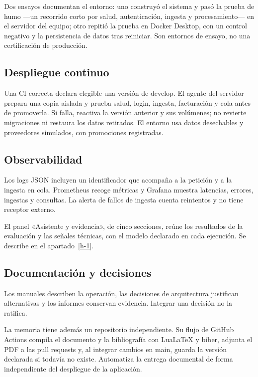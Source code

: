 Dos ensayos documentan el entorno: uno construyó el sistema y pasó la prueba de humo ---un recorrido corto por salud, autenticación, ingesta y procesamiento--- en el servidor del equipo; otro repitió la prueba en Docker Desktop, con un control negativo y la persistencia de datos tras reiniciar. Son entornos de ensayo, no una certificación de producción.

\subsection{Despliegue continuo}\label{f-4}

Una CI correcta declara elegible una versión de develop. El agente del servidor prepara una copia aislada y prueba salud, login, ingesta, facturación y cola antes de promoverla. Si falla, reactiva la versión anterior y sus volúmenes; no revierte migraciones ni restaura los datos retirados. El entorno usa datos desechables y proveedores simulados, con promociones registradas. \cite{despliegue}


\subsection{Observabilidad}\label{f-5}

Los logs JSON incluyen un identificador que acompaña a la petición y a la ingesta en cola. Prometheus recoge métricas y Grafana muestra latencias, errores, ingestas y consultas. La alerta de fallos de ingesta cuenta reintentos y no tiene receptor externo. \cite{despliegue}

El panel «Asistente y evidencia», de cinco secciones, reúne los resultados de la evaluación y las señales técnicas, con el modelo declarado en cada ejecución. Se describe en el apartado~\ref{h-1}. \cite{panel}

\subsection{Documentación y decisiones}\label{f-6}

Los manuales describen la operación, las decisiones de arquitectura justifican alternativas y los informes conservan evidencia. Integrar una decisión no la ratifica. \cite{adr}

La memoria tiene además un repositorio independiente. Su flujo de GitHub Actions compila el documento y la bibliografía con LuaLaTeX y biber, adjunta el PDF a las pull requests y, al integrar cambios en main, guarda la versión declarada si todavía no existe. Automatiza la entrega documental de forma independiente del despliegue de la aplicación. \cite{ci-memoria}
